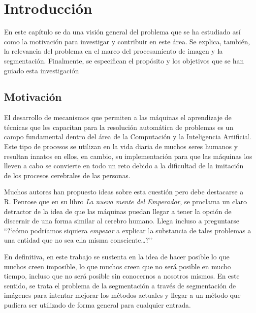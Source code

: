 \chapter{Introducción}

En este capítulo se da una visión general del problema que se ha estudiado así como la motivación para investigar y contribuir en este área. Se explica, también, la relevancia del problema en el marco del procesamiento de imagen y la segmentación. Finalmente, se especifican el propósito y los objetivos que se han guiado esta investigación


\section{Motivación}\label{sec:motivacion}

El desarrollo de mecanismos que permiten a las máquinas el aprendizaje de técnicas que les capacitan para la resolución automática de problemas es un campo fundamental dentro del área de la Computación y la Inteligencia Artificial. Este tipo de procesos se utilizan en la vida diaria de muchos seres humanos y resultan innatos en ellos, en cambio, su implementación para que las máquinas los lleven a cabo se convierte en todo un reto debido a la dificultad de la imitación de los procesos cerebrales de las personas.

Muchos autores \cite{lib:ross, lib:boden, art:searle, art:churchland} han propuesto ideas sobre esta cuestión pero debe destacarse a R. Penrose \cite{lib:penrose} que en su libro {\em La nueva mente del Emperador},  se proclama un claro detractor de la idea de que las máquinas puedan llegar a tener la opción de discernir de una forma similar al cerebro humano. Llega incluso a preguntarse ``?`cómo podríamos siquiera {\em empezar} a explicar la substancia de tales problemas a una entidad que no sea ella misma consciente\dots?''

En definitiva, en este trabajo se sustenta en la idea de hacer posible lo que muchos creen imposible, lo que muchos creen que no será posible en mucho tiempo, incluso que no será posible sin conocernos a nosotros mismos. En este sentido, se trata el problema de la segmentación a través de segmentación de imágenes para intentar mejorar los métodos actuales y llegar a un método que pudiera ser utilizado de forma general para cualquier entrada.


